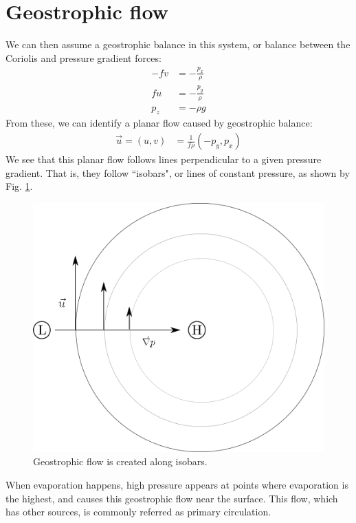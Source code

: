 \section{Geostrophic flow}
We can then assume a geostrophic balance in this system, or balance between the Coriolis and pressure gradient forces:
\begin{align}
    -fv &= -\frac{p_x}{\rho}\\
    fu &= -\frac{p_y}{\rho}\\
    \label{eqn:hydrobal}
    p_z &= -\rho g
\end{align}
From these, we can identify a planar flow caused by geostrophic balance:
\begin{align*}
    \vec{u} = (u,v) &= \frac{1}{f\rho}\left(-p_y, p_x\right)
\end{align*}
We see that this planar flow follows lines perpendicular to a given pressure gradient. That is, they follow ``isobars", or lines of constant pressure, as shown by Fig. \ref{fig:fig3}.
\begin{figure}
    \centering
    \includegraphics[width=0.5\linewidth]{assets/figure-3.png}
    \caption{Geostrophic flow is created along isobars.}
    \label{fig:fig3}
\end{figure}

When evaporation happens, high pressure appears at points where evaporation is the highest, and causes this geostrophic flow near the surface. This flow, which has other sources, is commonly referred as primary circulation. \cite{develop} 

